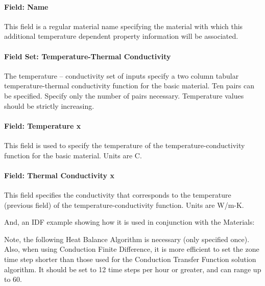 \paragraph{Field: Name}\label{field-name-6-022}

This field is a regular material name specifying the material with which this additional temperature dependent property information will be associated.

\paragraph{Field Set: Temperature-Thermal Conductivity}\label{field-set-temperature-thermal-conductivity}

The temperature -- conductivity set of inputs specify a two column tabular temperature-thermal conductivity function for the basic material. Ten pairs can be specified. Specify only the number of pairs necessary. Temperature values should be strictly increasing.

\paragraph{Field: Temperature x}\label{field-temperature-x-1}

This field is used to specify the temperature of the temperature-conductivity function for the basic material. Units are C.

\paragraph{Field: Thermal Conductivity x}\label{field-thermal-conductivity-x}

This field specifies the conductivity that corresponds to the temperature (previous field) of the temperature-conductivity function. Units are W/m-K.

And, an IDF example showing how it is used in conjunction with the Materials:

Note, the following Heat Balance Algorithm is necessary (only specified once). Also, when using Conduction Finite Difference, it is more efficient to set the zone time step shorter than those used for the Conduction Transfer Function solution algorithm. It should be set to 12 time steps per hour or greater, and can range up to 60.

